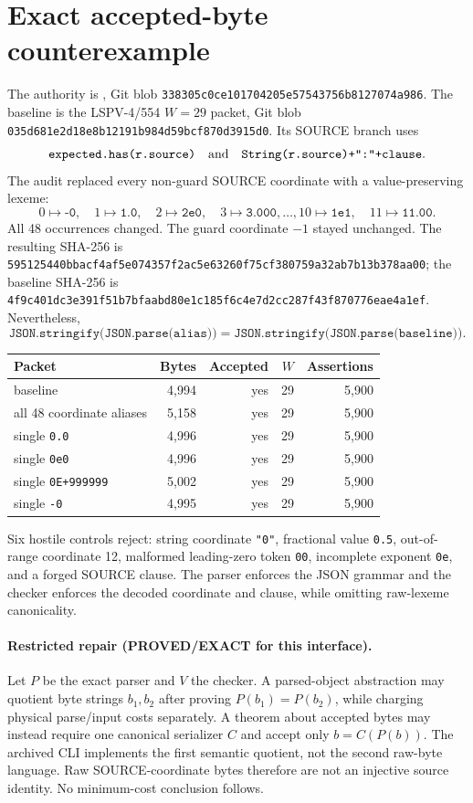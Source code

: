 \documentclass[11pt]{article}
\begin{document}
\section{Exact accepted-byte counterexample}
The authority is
, Git blob
\texttt{338305c0ce101704205e57543756b8127074a986}.  The baseline is the
LSPV-4/554 $W=29$ packet, Git blob
\texttt{035d681e2d18e8b12191b984d59bcf870d3915d0}.  Its SOURCE branch uses
\[
 \texttt{expected.has(r.source)}
 \quad\hbox{and}\quad
 \texttt{String(r.source)+":"+clause}.
\]
The audit replaced every non-guard SOURCE coordinate with a value-preserving
lexeme:
\[
0\mapsto\texttt{-0},\quad1\mapsto\texttt{1.0},\quad
2\mapsto\texttt{2e0},\quad3\mapsto\texttt{3.000},\ldots,
10\mapsto\texttt{1e1},\quad11\mapsto\texttt{11.00}.
\]
All 48 occurrences changed.  The guard coordinate $-1$ stayed unchanged.
The resulting SHA-256 is
\texttt{595125440bbacf4af5e074357f2ac5e63260f75cf380759a32ab7b13b378aa00};
the baseline SHA-256 is
\texttt{4f9c401dc3e391f51b7bfaabd80e1c185f6c4e7d2cc287f43f870776eae4a1ef}.
Nevertheless,
\[
 \texttt{JSON.stringify(JSON.parse(alias))}
 =
 \texttt{JSON.stringify(JSON.parse(baseline))}.
\]

\begin{center}
\begin{tabular}{lrrrr}
\toprule
Packet & Bytes & Accepted & $W$ & Assertions\\
\midrule
baseline & 4,994 & yes & 29 & 5,900\\
all 48 coordinate aliases & 5,158 & yes & 29 & 5,900\\
single \texttt{0.0} & 4,996 & yes & 29 & 5,900\\
single \texttt{0e0} & 4,996 & yes & 29 & 5,900\\
single \texttt{0E+999999} & 5,002 & yes & 29 & 5,900\\
single \texttt{-0} & 4,995 & yes & 29 & 5,900\\
\bottomrule
\end{tabular}
\end{center}

Six hostile controls reject: string coordinate \texttt{"0"}, fractional
value \texttt{0.5}, out-of-range coordinate 12, malformed leading-zero
token \texttt{00}, incomplete exponent \texttt{0e}, and a forged SOURCE
clause.  The parser enforces the JSON grammar and the checker enforces the
decoded coordinate and clause, while omitting raw-lexeme canonicality.

\paragraph{Restricted repair (PROVED/EXACT for this interface).}
Let $P$ be the exact parser and $V$ the checker.  A parsed-object abstraction
may quotient byte strings $b_1,b_2$ after proving $P(b_1)=P(b_2)$, while
charging physical parse/input costs separately.  A theorem about accepted
bytes may instead require one canonical serializer $C$ and accept only
$b=C(P(b))$.  The archived CLI implements the first semantic quotient, not
the second raw-byte language.  Raw SOURCE-coordinate bytes therefore are not
an injective source identity.  No minimum-cost conclusion follows.
\end{document}
